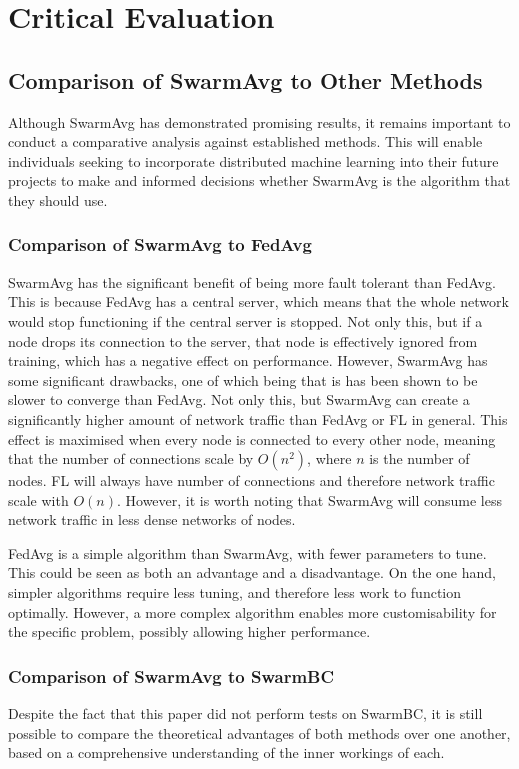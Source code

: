 \chapter{Critical Evaluation}
\section{Comparison of SwarmAvg to Other Methods}
Although SwarmAvg has demonstrated promising results, it remains important to conduct a comparative analysis against established methods. This will enable individuals seeking to incorporate distributed machine learning into their future projects to make and informed decisions whether SwarmAvg is the algorithm that they should use.

\subsection{Comparison of SwarmAvg to FedAvg}
SwarmAvg has the significant benefit of being more fault tolerant than FedAvg. This is because FedAvg has a central server, which means that the whole network would stop functioning if the central server is stopped. Not only this, but if a node drops its connection to the server, that node is effectively ignored from training, which has a negative effect on performance.
However, SwarmAvg has some significant drawbacks, one of which being that is has been shown to be slower to converge than FedAvg. Not only this, but SwarmAvg can create a significantly higher amount of network traffic than FedAvg or FL in general. This effect is maximised when every node is connected to every other node, meaning that the number of connections scale by $O(n^2)$, where $n$ is the number of nodes. FL will always have number of connections and therefore network traffic scale with $O(n)$. However, it is worth noting that SwarmAvg will consume less network traffic in less dense networks of nodes.

FedAvg is a simple algorithm than SwarmAvg, with fewer parameters to tune. This could be seen as both an advantage and a disadvantage. On the one hand, simpler algorithms require less tuning, and therefore less work to function optimally. However, a more complex algorithm enables more customisability for the specific problem, possibly allowing higher performance.

\subsection{Comparison of SwarmAvg to SwarmBC}
Despite the fact that this paper did not perform tests on SwarmBC, it is still possible to compare the theoretical advantages of both methods over one another, based on a comprehensive understanding of the inner workings of each.

